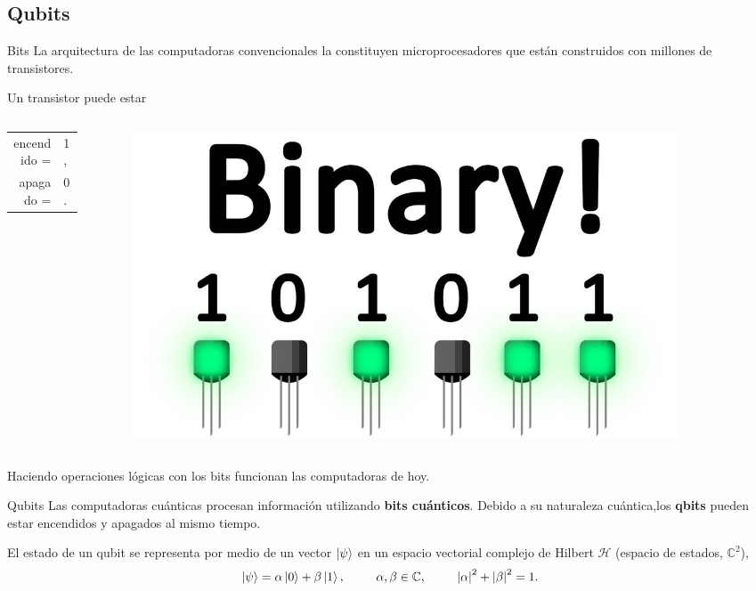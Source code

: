 \documentclass[11pt]{beamer}
\begin{document}
\subsection{Qubits}
\begin{frame}{Bits}
La arquitectura de las computadoras convencionales la constituyen
microprocesadores que están construidos con millones de transistores.\vfill

Un transistor puede estar
\begin{columns}
	\begin{column}{0.5\textwidth}
		\begin{center}
		\begin{tabular}{rl}
			encendido = & 1, \\ 
			apagado = & 0.
		\end{tabular} 
		\end{center}
	\end{column}
	\begin{column}{0.5\textwidth}
		\begin{figure}[H]
			\includegraphics[width=0.9\textwidth]{img-congreso/bits.jpg}
		\end{figure}
	\end{column}
\end{columns}\vfill

Haciendo operaciones lógicas con los bits funcionan 
las computadoras de hoy. 
\end{frame}


\begin{frame}{Qubits}
\vfill
Las computadoras cuánticas procesan información utilizando 
\textbf{bits cuánticos}. Debido a su naturaleza cuántica,los \textbf{qbits} 
pueden estar encendidos y apagados al mismo tiempo. \vfill

El estado de un qubit se representa por medio de 
un vector $\ket{\psi}$ en un espacio vectorial complejo de Hilbert 
$\mathcal{H}$ (espacio de estados, $\mathbb{C}^2$),
\begin{equation}
	\ket{\psi} = \alpha \ket{0} + \beta \ket{1}, \hspace{25pt}
	\alpha, \beta \in \mathbb{C},
	\hspace{25pt} \abs{\alpha}^2 + \abs{\beta}^2 = 1.
\end{equation} \vfill
\end{frame}
\end{document}
